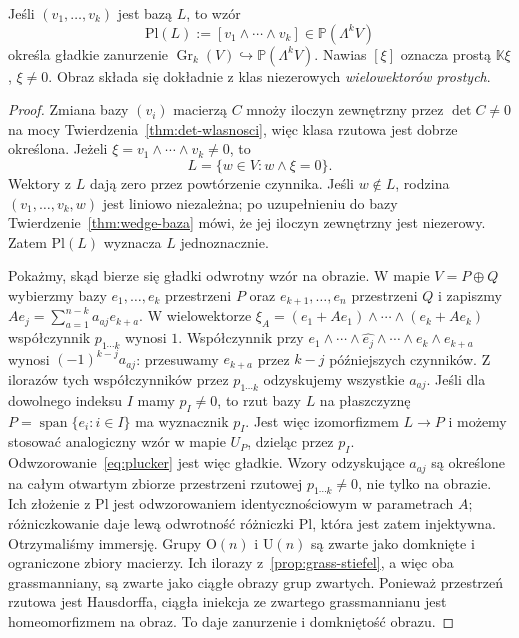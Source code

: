 \begin{twierdzenie}
\label{thm:grass-plucker}
Jeśli $(v_1,\ldots,v_k)$ jest bazą $L$, to wzór
\begin{equation}\label{eq:plucker}
 \mathrm{Pl}(L):=[v_1\wedge\cdots\wedge v_k]
 \in\mathbb P(\Lambda^k V)
\end{equation}
określa gładkie zanurzenie
$\operatorname{Gr}_k(V)\hookrightarrow\mathbb P(\Lambda^k V)$.
Nawias $[\xi]$ oznacza prostą $\mathbb K\xi$,
$\xi\ne0$. Obraz składa się dokładnie z klas
niezerowych \emph{wielowektorów prostych}.
\end{twierdzenie}
\begin{proof}
Zmiana bazy $(v_i)$ macierzą $C$ mnoży iloczyn
zewnętrzny przez $\det C\ne0$ na mocy
Twierdzenia~\ref{thm:det-wlasnosci}, więc klasa
rzutowa jest dobrze określona. Jeżeli
$\xi=v_1\wedge\cdots\wedge v_k\ne0$, to
\[
 L=\{w\in V:w\wedge\xi=0\}.
\]
Wektory z $L$ dają zero przez powtórzenie czynnika.
Jeśli $w\notin L$, rodzina $(v_1,\ldots,v_k,w)$
jest liniowo niezależna; po uzupełnieniu do bazy
Twierdzenie~\ref{thm:wedge-baza} mówi, że jej
iloczyn zewnętrzny jest niezerowy. Zatem
$\mathrm{Pl}(L)$ wyznacza $L$ jednoznacznie.

Pokażmy, skąd bierze się gładki odwrotny wzór na obrazie.
W mapie $V=P\oplus Q$ wybierzmy bazy
$e_1,\ldots,e_k$ przestrzeni $P$ oraz
$e_{k+1},\ldots,e_n$ przestrzeni $Q$ i zapiszmy
$Ae_j=\sum_{a=1}^{n-k}a_{aj}e_{k+a}$.
W wielowektorze
$\xi_A=(e_1+Ae_1)\wedge\cdots\wedge(e_k+Ae_k)$
współczynnik $p_{1\cdots k}$ wynosi $1$.
Współczynnik przy
$e_1\wedge\cdots\wedge\widehat{e_j}\wedge\cdots
\wedge e_k\wedge e_{k+a}$ wynosi
$(-1)^{k-j}a_{aj}$: przesuwamy $e_{k+a}$
przez $k-j$ późniejszych czynników.
Z ilorazów tych współczynników przez $p_{1\cdots k}$
odzyskujemy wszystkie $a_{aj}$.
Jeśli dla dowolnego indeksu $I$ mamy $p_I\ne0$,
to rzut bazy $L$ na płaszczyznę
$P=\operatorname{span}\{e_i:i\in I\}$ ma wyznacznik $p_I$.
Jest więc izomorfizmem $L\to P$ i możemy stosować
analogiczny wzór w mapie $U_P$, dzieląc przez $p_I$.
Odwzorowanie~\eqref{eq:plucker} jest więc gładkie.
Wzory odzyskujące $a_{aj}$ są określone na całym otwartym
zbiorze przestrzeni rzutowej $p_{1\cdots k}\ne0$, nie tylko
na obrazie. Ich złożenie z $\mathrm{Pl}$ jest odwzorowaniem identycznościowym
w parametrach $A$; różniczkowanie daje lewą odwrotność różniczki
$\mathrm{Pl}$, która jest zatem injektywna.
Otrzymaliśmy immersję. Grupy $\mathrm O(n)$ i $\mathrm U(n)$
są zwarte jako domknięte i ograniczone zbiory macierzy.
Ich ilorazy z~\ref{prop:grass-stiefel}, a więc oba
grassmanniany, są zwarte jako ciągłe obrazy grup zwartych.
Ponieważ przestrzeń rzutowa jest Hausdorffa,
ciągła iniekcja ze zwartego grassmannianu jest
homeomorfizmem na obraz. To daje zanurzenie i domkniętość obrazu.
\end{proof}

